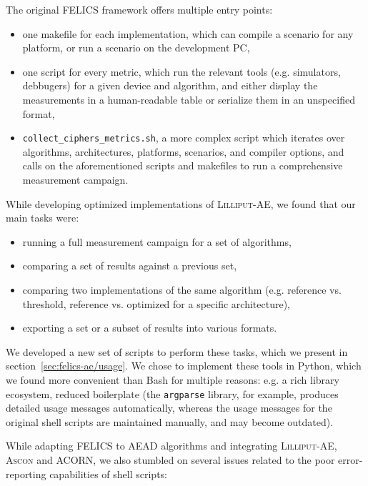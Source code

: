 \documentclass{article}
\begin{document}
The original FELICS framework offers multiple entry points:

\begin{itemize}
\item one makefile for each implementation, which can compile a
  scenario for any platform, or run a scenario on the development PC,
\item one script for every metric, which run the relevant tools
  (e.g. simulators, debbugers) for a given device and algorithm, and
  either display the measurements in a human-readable table or
  serialize them in an unspecified format,
\item \texttt{collect\_ciphers\_metrics.sh}, a more complex script
  which iterates over algorithms, architectures, platforms, scenarios,
  and compiler options, and calls on the aforementioned scripts and
  makefiles to run a comprehensive measurement campaign.
\end{itemize}

While developing optimized implementations of \textsc{Lilliput-AE}, we
found that our main tasks were:

\begin{itemize}
\item running a full measurement campaign for a set of algorithms,
\item comparing a set of results against a previous set,
\item comparing two implementations of the same algorithm
  (e.g. reference vs. threshold, reference vs. optimized for a
  specific architecture),
\item exporting a set or a subset of results into various formats.
\end{itemize}

We developed a new set of scripts to perform these tasks, which we
present in section~\ref{sec:felics-ae/usage}.  We chose to implement
these tools in Python, which we found more convenient than Bash for
multiple reasons: e.g. a rich library ecosystem, reduced boilerplate
(the \texttt{argparse} library, for example, produces detailed usage
messages automatically, whereas the usage messages for the original
shell scripts are maintained manually, and may become outdated).

While adapting FELICS to AEAD algorithms and integrating
\textsc{Lilliput-AE}, \textsc{Ascon} and ACORN, we also stumbled on
several issues related to the poor error-reporting capabilities of
shell scripts:
\end{document}
